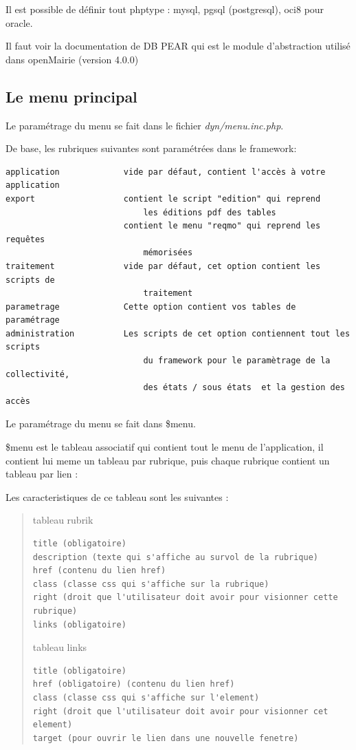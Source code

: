 \documentclass[letterpaper,10pt,french]{manual}
\begin{document}
Il est possible de définir tout phptype : mysql, pgsql (postgresql), oci8 pour oracle.

Il faut voir la documentation de DB PEAR qui est le module d'abstraction utilisé
dans openMairie (version 4.0.0)


\subsection{Le menu principal}

Le paramétrage du menu se fait dans le fichier \emph{dyn/menu.inc.php}.

De base, les rubriques suivantes sont paramétrées dans le framework:

\begin{Verbatim}[commandchars=@\[\]]
application             vide par défaut, contient l'accès à votre application
export                  contient le script "edition" qui reprend
                            les éditions pdf des tables
                        contient le menu "reqmo" qui reprend les requêtes
                            mémorisées
traitement              vide par défaut, cet option contient les scripts de
                            traitement
parametrage             Cette option contient vos tables de paramétrage
administration          Les scripts de cet option contiennent tout les scripts
                            du framework pour le paramètrage de la collectivité,
                            des états / sous états  et la gestion des accès
\end{Verbatim}

Le paramétrage du menu se fait dans \$menu.

\$menu est le tableau associatif qui contient tout le menu de l'application,
il contient lui meme un tableau par rubrique, puis chaque
rubrique contient un tableau par lien :

Les caracteristiques de ce tableau sont les suivantes :
\begin{quote}

tableau rubrik

\begin{Verbatim}[commandchars=@\[\]]
title (obligatoire)
description (texte qui s'affiche au survol de la rubrique)
href (contenu du lien href)
class (classe css qui s'affiche sur la rubrique)
right (droit que l'utilisateur doit avoir pour visionner cette rubrique)
links (obligatoire)
\end{Verbatim}

tableau links

\begin{Verbatim}[commandchars=@\[\]]
title (obligatoire)
href (obligatoire) (contenu du lien href)
class (classe css qui s'affiche sur l'element)
right (droit que l'utilisateur doit avoir pour visionner cet element)
target (pour ouvrir le lien dans une nouvelle fenetre)
\end{Verbatim}
\end{quote}
\end{document}
